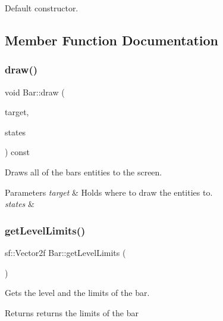 Default constructor. 



\subsection{Member Function Documentation}
\mbox{\label{class_bar_adcc40bc664443ae23e956423292cdabc}} 
\subsubsection{\texorpdfstring{draw()}{draw()}}
{\footnotesize\ttfamily void Bar\+::draw (\begin{DoxyParamCaption}\item[{sf\+::\+Render\+Target \&}]{target,  }\item[{sf\+::\+Render\+States}]{states }\end{DoxyParamCaption}) const\hspace{0.3cm}{\ttfamily [private]}}



Draws all of the bar\textquotesingle{}s entities to the screen. 


\begin{DoxyParams}{Parameters}
{\em target} & Holds where to draw the entities to. \\
\hline
{\em states} & \\
\hline
\end{DoxyParams}
\mbox{\label{class_bar_a73b6e7901e22862c7283e64597670c72}} 
\subsubsection{\texorpdfstring{get\+Level\+Limits()}{getLevelLimits()}}
{\footnotesize\ttfamily sf\+::\+Vector2f Bar\+::get\+Level\+Limits (\begin{DoxyParamCaption}{ }\end{DoxyParamCaption})}



Gets the level and the limits of the bar. 

\begin{DoxyReturn}{Returns}
returns the limits of the bar 
\end{DoxyReturn}
\mbox{\label{class_bar_a35368752d6d5871b485afc16eeb85c85}} 
